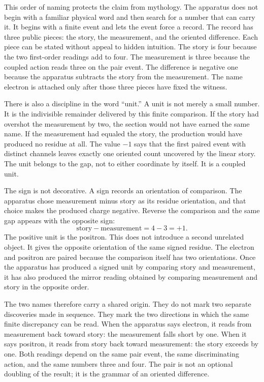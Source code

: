 This order of naming protects the claim from mythology. The apparatus does not
begin with a familiar physical word and then search for a number that can carry
it. It begins with a finite event and lets the event force a record. The record
has three public pieces: the story, the measurement, and the oriented
difference. Each piece can be stated without appeal to hidden intuition. The
story is four because the two first-order readings add to four. The measurement
is three because the coupled action reads three on the pair event. The
difference is negative one because the apparatus subtracts the story from the
measurement. The name electron is attached only after those three pieces have
fixed the witness.

There is also a discipline in the word ``unit.'' A unit is not merely a small
number. It is the indivisible remainder delivered by this finite comparison.
If the story had overshot the measurement by two, the section would not have
earned the same name. If the measurement had equaled the story, the production
would have produced no residue at all. The value \(-1\) says that the first
paired event with distinct channels leaves exactly one oriented count
uncovered by the linear story. The unit belongs to the gap, not to either
coordinate by itself. It is a coupled unit.

The sign is not decorative. A sign records an orientation of comparison. The
apparatus chose measurement minus story as its residue orientation, and that
choice makes the produced charge negative. Reverse the comparison and the same
gap appears with the opposite sign:
\[
  \text{story} - \text{measurement}
    = 4 - 3
    = +1.
\]
The positive unit is the positron. This does not introduce a second unrelated
object. It gives the opposite orientation of the same signed residue. The
electron and positron are paired because the comparison itself has two
orientations. Once the apparatus has produced a signed unit by comparing story
and measurement, it has also produced the mirror reading obtained by comparing
measurement and story in the opposite order.

The two names therefore carry a shared origin. They do not mark two separate
discoveries made in sequence. They mark the two directions in which the same
finite discrepancy can be read. When the apparatus says electron, it reads from
measurement back toward story: the measurement falls short by one. When it says
positron, it reads from story back toward measurement: the story exceeds by
one. Both readings depend on the same pair event, the same discriminating
action, and the same numbers three and four. The pair is not an optional
doubling of the result; it is the grammar of an oriented difference.

